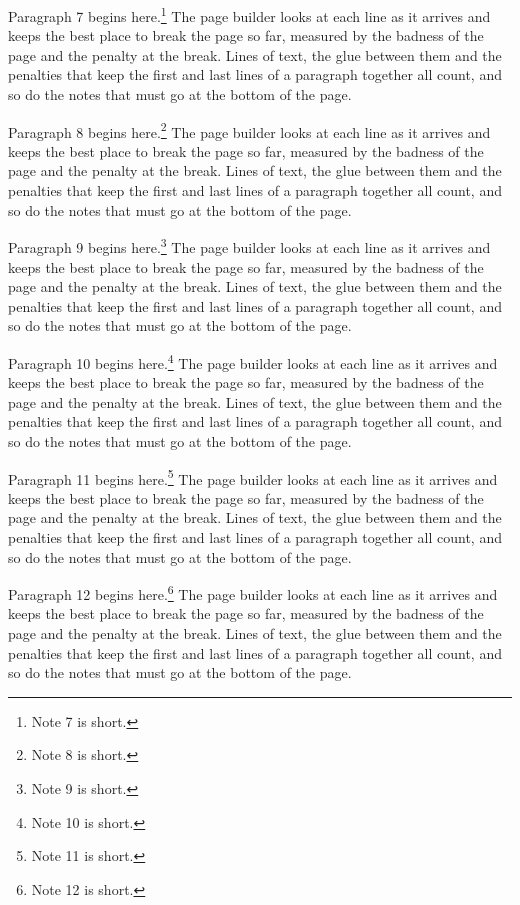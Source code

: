 \documentclass[12pt]{book}
\begin{document}
Paragraph 7 begins here.\footnote{Note 7 is short.} The page builder looks at each line as it arrives and keeps the best place to break the page so far, measured by the badness of the page and the penalty at the break. Lines of text, the glue between them and the penalties that keep the first and last lines of a paragraph together all count, and so do the notes that must go at the bottom of the page.

Paragraph 8 begins here.\footnote{Note 8 is short.} The page builder looks at each line as it arrives and keeps the best place to break the page so far, measured by the badness of the page and the penalty at the break. Lines of text, the glue between them and the penalties that keep the first and last lines of a paragraph together all count, and so do the notes that must go at the bottom of the page.

Paragraph 9 begins here.\footnote{Note 9 is short.} The page builder looks at each line as it arrives and keeps the best place to break the page so far, measured by the badness of the page and the penalty at the break. Lines of text, the glue between them and the penalties that keep the first and last lines of a paragraph together all count, and so do the notes that must go at the bottom of the page.

Paragraph 10 begins here.\footnote{Note 10 is short.} The page builder looks at each line as it arrives and keeps the best place to break the page so far, measured by the badness of the page and the penalty at the break. Lines of text, the glue between them and the penalties that keep the first and last lines of a paragraph together all count, and so do the notes that must go at the bottom of the page.

Paragraph 11 begins here.\footnote{Note 11 is short.} The page builder looks at each line as it arrives and keeps the best place to break the page so far, measured by the badness of the page and the penalty at the break. Lines of text, the glue between them and the penalties that keep the first and last lines of a paragraph together all count, and so do the notes that must go at the bottom of the page.

Paragraph 12 begins here.\footnote{Note 12 is short.} The page builder looks at each line as it arrives and keeps the best place to break the page so far, measured by the badness of the page and the penalty at the break. Lines of text, the glue between them and the penalties that keep the first and last lines of a paragraph together all count, and so do the notes that must go at the bottom of the page.
\end{document}
